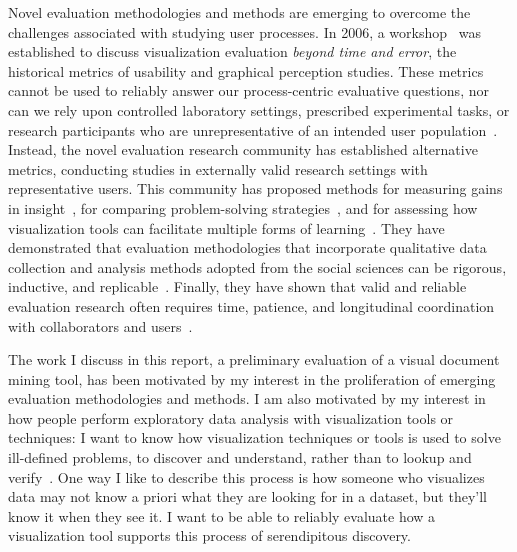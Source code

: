 Novel evaluation methodologies and methods are emerging to overcome the challenges associated with studying user processes. 
In 2006, a workshop~\cite{Bertini2008} was established to discuss visualization evaluation {\it beyond time and error}, the historical metrics of usability and graphical perception studies. 
These metrics cannot be used to reliably answer our process-centric evaluative questions, nor can we rely upon controlled laboratory settings, prescribed experimental tasks, or research participants who are unrepresentative of an intended user population~\cite{Carpendale2008,Plaisant2004,Sutcliffe2000}. 
Instead, the novel evaluation research community has established alternative metrics, conducting studies in externally valid research settings with representative users.
This community has proposed methods for measuring gains in insight~\cite{Saraiya2005b,Saraiya2006}, for comparing problem-solving strategies~\cite{Mayr2010}, and for assessing how visualization tools can facilitate multiple forms of learning~\cite{Chang2010}. 
They have demonstrated that evaluation methodologies that incorporate qualitative data collection and analysis methods adopted from the social sciences can be rigorous, inductive, and replicable~\cite{Isenberg2008,Kang2011,Tory2008}.
Finally, they have shown that valid and reliable evaluation research often requires time, patience, and longitudinal coordination with collaborators and users~\cite{Lloyd2011,Saraiya2006,Shneiderman2006}.

The work I discuss in this report, a preliminary evaluation of a visual document mining tool, has been motivated by my interest in the proliferation of emerging evaluation methodologies and methods. 
I am also motivated by my interest in how people perform exploratory data analysis with visualization tools or techniques: I want to know how visualization techniques or tools is used to solve ill-defined problems, to discover and understand, rather than to lookup and verify~\cite{Marchionini2006}. 
One way I like to describe this process is how someone who visualizes data may not know a priori what they are looking for in a dataset, but they'll know it when they see it. 
I want to be able to reliably evaluate how a visualization tool supports this process of serendipitous discovery. 


